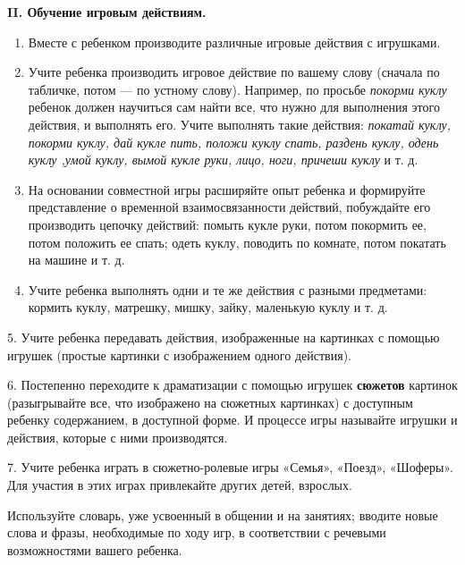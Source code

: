 \documentclass{book}
\renewcommand{\emph}[1]{\textit{#1}}
\begin{document}
\textbf{II. Обучение игровым действиям.}


\begin{enumerate}
\def\labelenumi{\arabic{enumi}.}
\item
  
  Вместе с ребенком производите различные игровые действия с игрушками.
  
\item
  
  Учите ребенка производить игровое действие по вашему слову (сначала по
  табличке, потом --- по устному слову). Например, по просьбе
  \emph{покорми куклу} ребенок должен научиться сам найти все, что нужно
  для выполнения этого действия, и выполнять его. Учите выполнять такие
  действия: \emph{покатай куклу, покорми куклу, дай кукле пить, положи
  куклу спать, раздень куклу, одень куклу ,умой куклу, вымой кукле руки,
  лицо, ноги, причеши куклу} и т. д.
  
\item
  
  На основании совместной игры расширяйте опыт ребенка и формируйте
  представление о временной взаимосвязанности действий, побуждайте его
  производить цепочку действий: помыть кукле руки, потом покормить ее,
  потом положить ее спать; одеть куклу, поводить по комнате, потом
  покатать на машине и т. д.
  
\item
  
  Учите ребенка выполнять одни и те же действия с разными предметами:
  кормить куклу, матрешку, мишку, зайку, маленькую куклу и т. д.
  
\end{enumerate}


5. Учите ребенка передавать действия, изображенные на картинках с
помощью игрушек (простые картинки с изображением одного действия).

6. Постепенно переходите к драматизации с помощью игрушек
\textbf{сюжетов} картинок (разыгрывайте все, что изображено на сюжетных
картинках) с доступным ребенку содержанием, в доступной форме. И
процессе игры называйте игрушки и действия, которые с ними производятся.

7. Учите ребенка играть в сюжетно-ролевые игры «Семья», «Поезд»,
«Шоферы». Для участия в этих играх привлекайте других детей, взрослых.

Используйте словарь, уже усвоенный в общении и на занятиях; вводите
новые слова и фразы, необходимые по ходу игр, в соответствии с речевыми
возможностями вашего ребенка.
\end{document}
